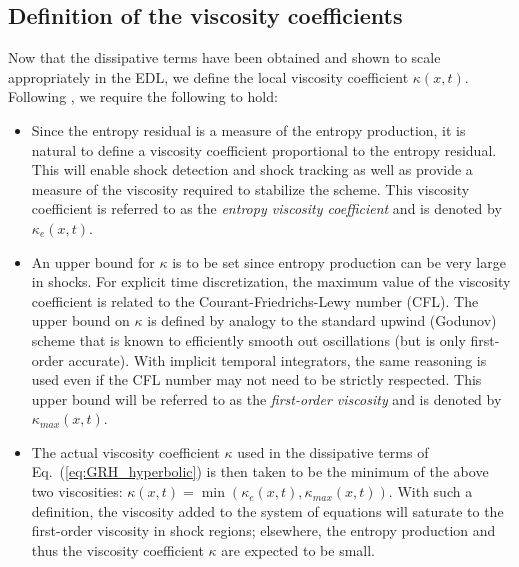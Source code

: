 \documentclass[review]{elsarticle}
\newcommand{\eqt}[1]{Eq.~(\ref{#1})}                     %
\begin{document}
\subsection{Definition of the viscosity coefficients}
%
Now that the dissipative terms have been obtained and shown to scale appropriately in the EDL, we define the local viscosity coefficient $\kappa(x,t)$. Following \cite{jlg1, jlg2}, we require the following to hold:
\begin{itemize}
\item Since the entropy residual is a measure of the entropy production, it is natural to define a viscosity coefficient proportional to the entropy residual. This will enable shock detection and shock tracking as well as provide a measure of the viscosity required to stabilize the scheme. This viscosity coefficient is referred to as the \emph{entropy viscosity coefficient} and is denoted by $\kappa_e(x,t)$.
\item An upper bound for $\kappa$ is to be set since entropy production can be very large in shocks. For explicit time discretization, the maximum value of the viscosity coefficient is related to the Courant-Friedrichs-Lewy number (CFL). The upper bound on  $\kappa$  is defined by analogy to the standard upwind (Godunov) scheme that is known to efficiently smooth out oscillations (but is only first-order accurate). With implicit temporal integrators, the same reasoning is used even if the CFL number may not need to be strictly respected. This upper bound will be referred to as the \emph{first-order viscosity} and is denoted by $\kappa_{max}(x,t)$.  
\item The actual viscosity coefficient $\kappa$ used in the dissipative terms of \eqt{eq:GRH_hyperbolic} is then taken to be the minimum of the above two viscosities:  $\kappa(x,t) = \min ( \kappa_e(x,t), \kappa_{max}(x,t) )$. With such a definition, the viscosity added to the system of equations will saturate to the first-order viscosity in shock regions; elsewhere, the entropy production and thus the viscosity coefficient $\kappa$ are expected to be small.
\end{itemize}
\end{document}
